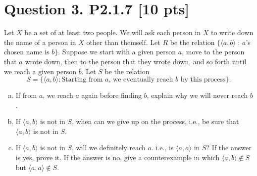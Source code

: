 \documentclass[12pt]{article}
\begin{document}
	\newpage

	\section*{\textbf{Question 3. P2.1.7} [10 pts]}
	Let $X$ be a set of at least two people. We will ask each person in $X$ to write
	down the name of a person in $X$ other than themself. Let $R$ be the relation
	$\{\langle a, b\rangle$ : $a$’s chosen name is $b\}$. Suppose we start with a
	given person $a$, move to the person that $a$ wrote down, then to the person
	that they wrote down, and so forth until we reach a given person $b$. Let $S$
	be the relation
	\[
		S =\{\langle a, b\rangle: \mbox{Starting from $a$, we eventually reach $b$ by
		this process}\}.
	\]
	\begin{enumerate}[(a)]
		\item If from $a$, we reach $a$ again before finding $b$, explain why we will
			never reach $b$.

		\item If $\langle a, b\rangle$ is not in $S$, when can we give up on the
			process, i.e., be sure that $\langle a, b\rangle$ is not in $S.$

		\item If $\langle a, b\rangle$ is not in $S$, will we definitely reach $a$. i.e.,
			is $\langle a, a\rangle$ in $S?$ If the answer is yes, prove it. If the answer
			is no, give a counterexample in which $\langle a, b\rangle \not\in S$ but
			$\langle a, a\rangle \not\in S.$
	\end{enumerate}
\end{document}
